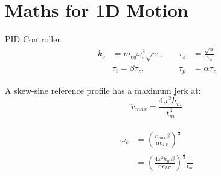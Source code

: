 \section{Maths for 1D Motion}

PID Controller
\begin{equation}
\begin{aligned}
k_c&=m_{eq}\omega_c^2\sqrt{\alpha} , \quad & \tau_z&=\frac{\sqrt{\alpha}}{\omega_c}\\
&\tau_i = \beta \tau_z , \quad &
\tau_p&=\alpha \tau_z
\end{aligned}
\label{eq:PIDsettings}
\end{equation}



A skew-sine reference profile has a maximum jerk at:
\begin{equation}
\dddot{r}_{max} = \frac{4\pi^2 h_m}{t_m^3}
\end{equation}


\begin{align}
\omega_c & = \left( \frac{\dddot{r}_{max} \beta}{\alpha e_{LF}} \right)^{\frac{1}{3}} 
\label{eq:omegac} \\
         & = \left( \frac{4\pi^2h_m\beta}{\alpha e_{LF}} \right)^{\frac{1}{3}} \frac{1}{t_m} 
\end{align}


